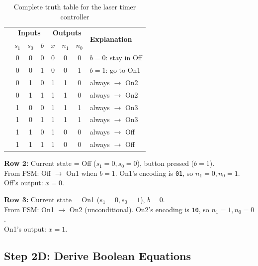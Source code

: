 \documentclass[12pt, a4paper]{article}
\begin{document}
\begin{table}[H]
\centering
\renewcommand{\arraystretch}{1.3}
\begin{tabular}{@{} >{\bfseries}c | c c c | c c c | l @{}}
  \toprule
  \multirow{2}{*}{State} & \multicolumn{3}{c|}{\textbf{Inputs}} & \multicolumn{3}{c|}{\textbf{Outputs}} & \multirow{2}{*}{\textbf{Explanation}} \\
  & $s_1$ & $s_0$ & $b$ & $x$ & $n_1$ & $n_0$ & \\
  \midrule
  \multirow{2}{*}{Off} 
    & 0 & 0 & 0 & 0 & 0 & 0 & $b{=}0$: stay in Off \\
    & 0 & 0 & 1 & 0 & 0 & 1 & $b{=}1$: go to On1 \\
  \midrule
  \multirow{2}{*}{On1}
    & 0 & 1 & 0 & 1 & 1 & 0 & always $\to$ On2 \\
    & 0 & 1 & 1 & 1 & 1 & 0 & always $\to$ On2 \\
  \midrule
  \multirow{2}{*}{On2}
    & 1 & 0 & 0 & 1 & 1 & 1 & always $\to$ On3 \\
    & 1 & 0 & 1 & 1 & 1 & 1 & always $\to$ On3 \\
  \midrule
  \multirow{2}{*}{On3}
    & 1 & 1 & 0 & 1 & 0 & 0 & always $\to$ Off \\
    & 1 & 1 & 1 & 1 & 0 & 0 & always $\to$ Off \\
  \bottomrule
\end{tabular}
\caption{Complete truth table for the laser timer controller}
\label{tab:truth-laser}
\end{table}

\begin{tip}
  \textbf{Row 2:} Current state = Off ($s_1{=}0, s_0{=}0$), button pressed ($b{=}1$).\\
  From FSM: Off $\to$ On1 when $b{=}1$. On1's encoding is \texttt{01}, so $n_1{=}0, n_0{=}1$.\\
  Off's output: $x{=}0$.
  
  \vspace{4pt}
  \textbf{Row 3:} Current state = On1 ($s_1{=}0, s_0{=}1$), $b{=}0$.\\
  From FSM: On1 $\to$ On2 (unconditional). On2's encoding is \texttt{10}, so $n_1{=}1, n_0{=}0$.\\
  On1's output: $x{=}1$.
\end{tip}

\subsection{Step 2D: Derive Boolean Equations}
\end{document}
